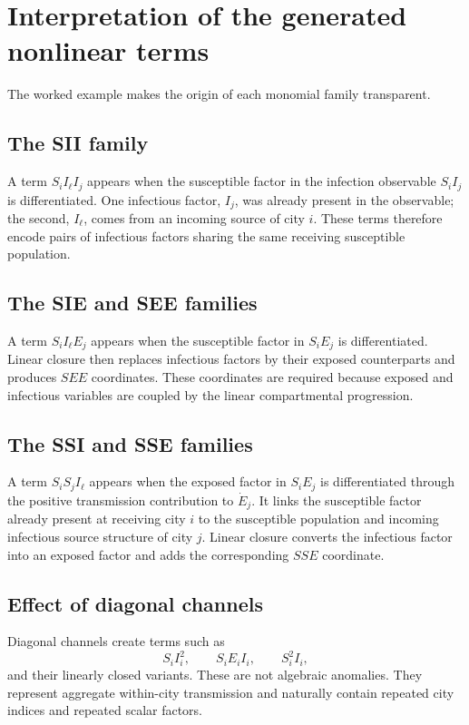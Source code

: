 \section{Interpretation of the generated nonlinear terms}
\label{sec:interpretation}

The worked example makes the origin of each monomial family transparent.

\subsection{The SII family}

A term $S_iI_\ell I_j$ appears when the susceptible factor in the infection
observable $S_iI_j$ is differentiated. One infectious factor, $I_j$, was
already present in the observable; the second, $I_\ell$, comes from an incoming
source of city $i$. These terms therefore encode pairs of infectious factors
sharing the same receiving susceptible population.

\subsection{The SIE and SEE families}

A term $S_iI_\ell E_j$ appears when the susceptible factor in $S_iE_j$ is
differentiated. Linear closure then replaces infectious factors by their
exposed counterparts and produces $SEE$ coordinates. These coordinates are
required because exposed and infectious variables are coupled by the linear
compartmental progression.

\subsection{The SSI and SSE families}

A term $S_iS_jI_\ell$ appears when the exposed factor in $S_iE_j$ is
differentiated through the positive transmission contribution to $\dot E_j$.
It links the susceptible factor already present at receiving city $i$ to the
susceptible population and incoming infectious source structure of city $j$.
Linear closure converts the infectious factor into an exposed factor and adds
the corresponding $SSE$ coordinate.

\subsection{Effect of diagonal channels}

Diagonal channels create terms such as
\[
S_iI_i^2,
\qquad
S_iE_iI_i,
\qquad
S_i^2I_i,
\]
and their linearly closed variants. These are not algebraic anomalies. They
represent aggregate within-city transmission and naturally contain repeated
city indices and repeated scalar factors.


